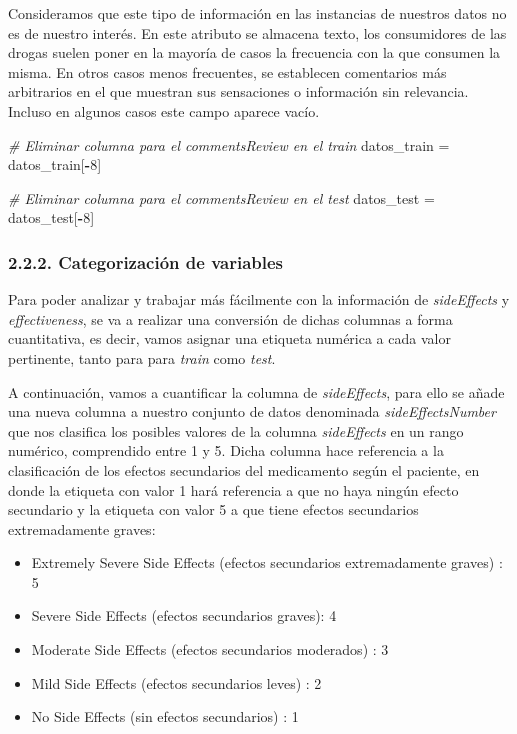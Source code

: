 \documentclass[spanish,]{article}
\newenvironment{Shaded}{\begin{snugshade}}{\end{snugshade}}
\newcommand{\DecValTok}[1]{\textcolor[rgb]{0.00,0.00,0.81}{#1}}
\newcommand{\StringTok}[1]{\textcolor[rgb]{0.31,0.60,0.02}{#1}}
\newcommand{\CommentTok}[1]{\textcolor[rgb]{0.56,0.35,0.01}{\textit{#1}}}
\newcommand{\OperatorTok}[1]{\textcolor[rgb]{0.81,0.36,0.00}{\textbf{#1}}}
\newcommand{\NormalTok}[1]{#1}
\providecommand{\tightlist}{%
  \setlength{\itemsep}{0pt}\setlength{\parskip}{0pt}}
\begin{document}
Consideramos que este tipo de información en las instancias de nuestros
datos no es de nuestro interés. En este atributo se almacena texto, los
consumidores de las drogas suelen poner en la mayoría de casos la
frecuencia con la que consumen la misma. En otros casos menos
frecuentes, se establecen comentarios más arbitrarios en el que muestran
sus sensaciones o información sin relevancia. Incluso en algunos casos
este campo aparece vacío.

\begin{Shaded}
\begin{Highlighting}[]
\CommentTok{# Eliminar columna para el commentsReview en el train}
\NormalTok{datos_train =}\StringTok{ }\NormalTok{datos_train[}\OperatorTok{-}\DecValTok{8}\NormalTok{]}

\CommentTok{# Eliminar columna para el commentsReview en el test}
\NormalTok{datos_test =}\StringTok{ }\NormalTok{datos_test[}\OperatorTok{-}\DecValTok{8}\NormalTok{]}
\end{Highlighting}
\end{Shaded}

\subsubsection{2.2.2. Categorización de
variables}\label{categorizacion-de-variables}

Para poder analizar y trabajar más fácilmente con la información de
\emph{sideEffects} y \emph{effectiveness}, se va a realizar una
conversión de dichas columnas a forma cuantitativa, es decir, vamos
asignar una etiqueta numérica a cada valor pertinente, tanto para para
\emph{train} como \emph{test}.

A continuación, vamos a cuantificar la columna de \emph{sideEffects},
para ello se añade una nueva columna a nuestro conjunto de datos
denominada \emph{sideEffectsNumber} que nos clasifica los posibles
valores de la columna \emph{sideEffects} en un rango numérico,
comprendido entre 1 y 5. Dicha columna hace referencia a la
clasificación de los efectos secundarios del medicamento según el
paciente, en donde la etiqueta con valor 1 hará referencia a que no haya
ningún efecto secundario y la etiqueta con valor 5 a que tiene efectos
secundarios extremadamente graves:

\begin{itemize}
\tightlist
\item
  Extremely Severe Side Effects (efectos secundarios extremadamente
  graves) : 5
\item
  Severe Side Effects (efectos secundarios graves): 4
\item
  Moderate Side Effects (efectos secundarios moderados) : 3
\item
  Mild Side Effects (efectos secundarios leves) : 2
\item
  No Side Effects (sin efectos secundarios) : 1
\end{itemize}
\end{document}
